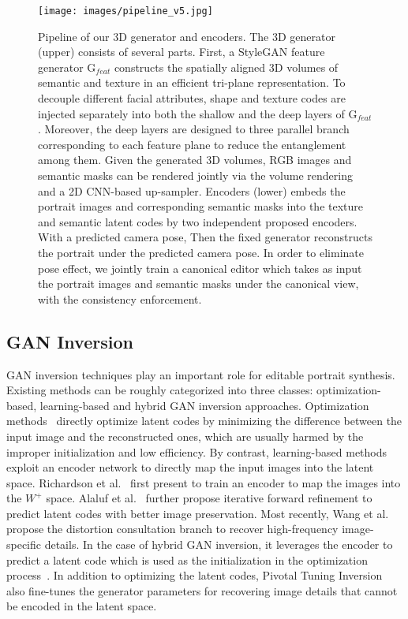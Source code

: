 \documentclass[acmtog]{acmart}
\begin{document}
\begin{figure*}[htbp]
  \centering
  \texttt{[image: images/pipeline\_v5.jpg]}
  \caption{Pipeline of our 3D generator and encoders. The 3D generator (upper) consists of several parts. First, a StyleGAN feature generator $\mathrm{G}_{feat}$ constructs the spatially aligned 3D volumes of semantic and texture in an efficient tri-plane representation. To decouple different facial attributes, shape and texture codes are injected separately into both the shallow and the deep layers of $\mathrm{G}_{feat}$. Moreover, the deep layers are designed to three parallel branch corresponding to each feature plane to reduce the entanglement among them. Given the generated 3D volumes, RGB images and semantic masks can be rendered jointly via the volume rendering and a 2D CNN-based up-sampler. Encoders (lower) embeds the portrait images and corresponding semantic masks into the texture and semantic latent codes by two independent proposed encoders. With a predicted camera pose, Then the fixed generator reconstructs the portrait under the predicted camera pose. In order to eliminate pose effect, we jointly train a canonical editor which takes as input the portrait images and semantic masks under the canonical view, with the consistency enforcement.}
  \Description{}
  \label{pipeline}
\end{figure*}

\subsection{GAN Inversion}

GAN inversion techniques play an important role for editable portrait synthesis. Existing methods can be roughly categorized into three classes: optimization-based, learning-based and hybrid GAN inversion approaches. Optimization methods~\cite{abdal2019image2stylegan,abdal2020image2stylegan++} directly optimize latent codes by minimizing the difference between the input image and the reconstructed ones, which are usually harmed by the improper initialization and low efficiency. By contrast, learning-based methods exploit an encoder network to directly map the input images into the latent space. Richardson et al.~\cite{richardson2021encoding} first present to train an encoder to map the images into the $W^{+}$ space. Alaluf et al.~\cite{alaluf2021restyle} further propose iterative forward refinement to predict latent codes with better image preservation. Most recently, Wang et al.~\cite{wang2021HFGI} propose the distortion consultation branch to recover high-frequency image-specific details. In the case of hybrid GAN inversion, it leverages the encoder to predict a latent code which is used as the initialization in the optimization process~\cite{zhu2020indomain}. In addition to optimizing the latent codes, Pivotal Tuning Inversion~\cite{roich2021pivotal} also fine-tunes the generator parameters for recovering image details that cannot be encoded in the latent space.
\end{document}
